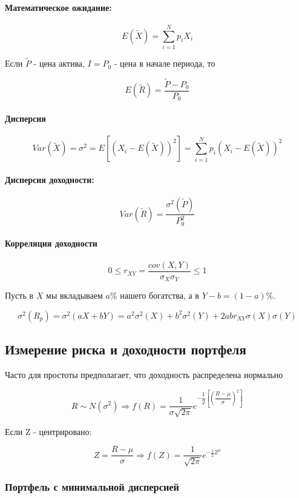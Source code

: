 \documentclass[a4paper,12pt]{article} %
\begin{document}
\paragraph{Математическое ожидание:}

\[ E(\tilde{X})  = \sum_{i=1}^{N} p_i X_i  \]

Если $ \tilde{P} $ - цена актива, $ I = P_0 $ - цена в начале периода, то 

\[ E (\tilde{R}) = \dfrac{\tilde{P} - P_0}{P_0} \]

\paragraph{Дисперсия}

\[ Var(\tilde{X}) = \sigma^2 = E [(X_i - E(\tilde{X}))^2] = \sum_{i=1}^{N} p_i (X_i - E(\tilde{X}))^2 \] 

\paragraph{Дисперсия доходности:}  \[ Var(\tilde{R}) = \dfrac{\sigma^2(\tilde{P})}{P_{0}^{2}}\]


\paragraph{Корреляция доходности}

\[ 0 \leq r_{XY} = \dfrac{cov(X,Y)}{\sigma_X\sigma_Y} \leq 1 \]

  Пусть в $ X $  мы вкладываем $  a \% $ нашего богатства, а в $ Y - b=(1-a) \% $.
  
  \[ \sigma^2(R_p) = \sigma^2(aX+bY)  = a^2\sigma^2(X) + b^2\sigma^2(Y) + 2 ab r_{XY} \sigma(X)  \sigma(Y)    \]

\subsection{Измерение риска и доходности портфеля}

 Часто для простоты предполагает, что доходность распределена нормально 
 
 \[ R \sim N(\sigma^2) \Rightarrow f(R) =  \dfrac{1}{\sigma \sqrt{2\pi}} e^{-\dfrac{1}{2} \left[\left( \dfrac{R-\mu}{\sigma}\right) ^2\right]} \]
 
 Если Z - центрировано:
 
 \[ Z =  \dfrac{R-\mu}{\sigma} \Rightarrow f(Z) =  \dfrac{1}{ \sqrt{2\pi}} e^{-\frac{1}{2} Z^2} \]
 
 
\subsubsection{ Портфель с минимальной дисперсией }
  
\end{document}

